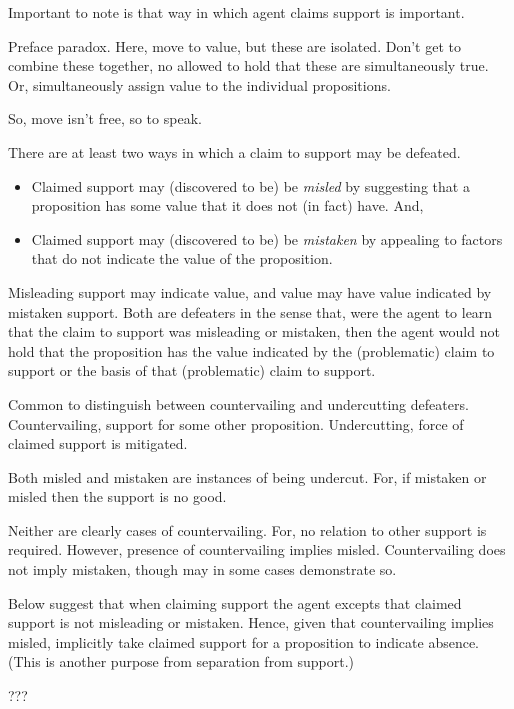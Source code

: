 \begin{note}
  \color{red}
  Important to note is that way in which agent claims support is important.

  Preface paradox.
  Here, move to value, but these are isolated.
  Don't get to combine these together, no allowed to hold that these are simultaneously true.
  Or, simultaneously assign value to the individual propositions.

  So, move isn't free, so to speak.
\end{note}

\begin{note}
  \begin{proposition}
    There are at least two ways in which a claim to support may be defeated.
      \begin{itemize}
      \item Claimed support may (discovered to be) be \emph{misled} by suggesting that a proposition has some value that it does not (in fact) have. And,
      \item Claimed support may (discovered to be) be \emph{mistaken} by appealing to factors that do not indicate the value of the proposition.
      \end{itemize}
      \vspace{-\topsep}\vspace{-\topsep}
  \end{proposition}
  Misleading support may indicate value, and value may have value indicated by mistaken support.
  Both are defeaters in the sense that, were the agent to learn that the claim to support was misleading or mistaken, then the agent would not hold that the proposition has the value indicated by the (problematic) claim to support or the basis of that (problematic) claim to support.

  Common to distinguish between countervailing and undercutting defeaters.
  Countervailing, support for some other proposition.
  Undercutting, force of claimed support is mitigated.

  Both misled and mistaken are instances of being undercut.
  For, if mistaken or misled then the support is no good.

  Neither are clearly cases of countervailing.
  For, no relation to other support is required.
  However, presence of countervailing implies misled.
  Countervailing does not imply mistaken, though may in some cases demonstrate so.

  Below suggest that when claiming support the agent excepts that claimed support is not misleading or mistaken.
  Hence, given that countervailing implies misled, implicitly take claimed support for a proposition to indicate absence.
  (This is another purpose from separation from support.)

  ???
\end{note}

